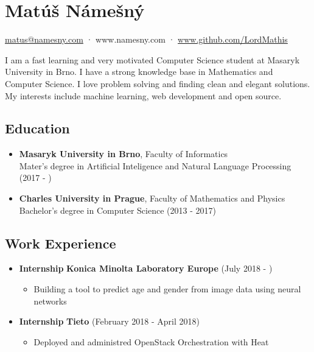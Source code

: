 \documentclass[a4,12pt]{article}
\begin{document}
\section*{Matúš Námešný}


\begin{center}
\href{mailto:matus@namesny.com}{matus@namesny.com} · www.namesny.com · \href{www.github.com/LordMathis}{www.github.com/LordMathis}
\end{center}

I am a fast learning and very motivated Computer Science student at
Masaryk University in Brno. I have a strong knowledge base in
Mathematics and Computer Science. I love problem solving and finding
clean and elegant solutions. My interests include machine learning, web
development and open source.


\subsection*{Education}\label{education}

\begin{itemize}
\item
  \textbf{Masaryk University in Brno}, Faculty of Informatics\\
  Mater's degree in Artificial Inteligence and Natural Language Processing (2017 - )
\item
  \textbf{Charles University in Prague}, Faculty of Mathematics and
  Physics\\
  Bachelor's degree in Computer Science (2013 - 2017)
\end{itemize}

\subsection*{Work Experience}\label{work}

\begin{itemize}
\item
  \textbf{Internship} \hfill \textbf{Konica Minolta Laboratory Europe} \hfill (July 2018 - )
  \begin{itemize}
      \item Building a tool to predict age and gender from image data using neural networks
  \end{itemize}
\item
  \textbf{Internship} \hfill \textbf{Tieto} \hfill (February 2018 - April 2018)
  \begin{itemize}
      \item Deployed and administred OpenStack Orchestration with Heat
  \end{itemize}
\end{itemize}
\end{document}
